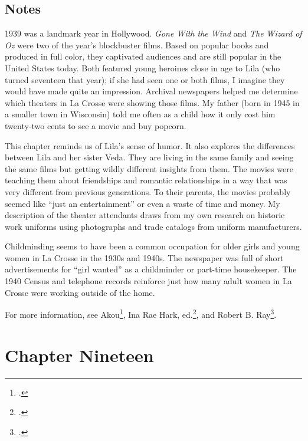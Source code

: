 \documentclass[
  letterpaper,
]{book}
\begin{document}
\section{Notes}\label{notes-19}

1939 was a landmark year in Hollywood. \emph{Gone With the Wind} and
\emph{The Wizard of Oz} were two of the year's blockbuster films. Based
on popular books and produced in full color, they captivated audiences
and are still popular in the United States today. Both featured young
heroines close in age to Lila (who turned seventeen that year); if she
had seen one or both films, I imagine they would have made quite an
impression. Archival newspapers helped me determine which theaters in La
Crosse were showing those films. My father (born in 1945 in a smaller
town in Wisconsin) told me often as a child how it only cost him
twenty-two cents to see a movie and buy popcorn.

This chapter reminds us of Lila's sense of humor. It also explores the
differences between Lila and her sister Veda. They are living in the
same family and seeing the same films but getting wildly different
insights from them. The movies were teaching them about friendships and
romantic relationships in a way that was very different from previous
generations. To their parents, the movies probably seemed like ``just an
entertainment'' or even a waste of time and money. My description of the
theater attendants draws from my own research on historic work uniforms
using photographs and trade catalogs from uniform manufacturers.

Childminding seems to have been a common occupation for older girls and
young women in La Crosse in the 1930s and 1940s. The newspaper was full
of short advertisements for ``girl wanted'' as a childminder or
part-time housekeeper. The 1940 Census and telephone records reinforce
just how many adult women in La Crosse were working outside of the home.

For more information, see Akou\footnote{.}, Ina Rae Hark, ed.\footnote{.}, and Robert B.
Ray\footnote{.}.


\chapter{Chapter Nineteen}\label{chapter-nineteen}
\end{document}
